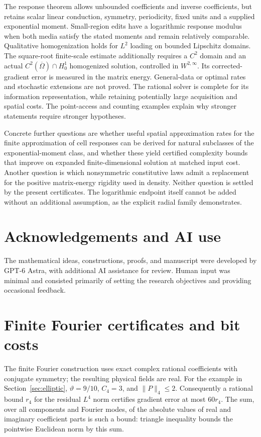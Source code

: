 \documentclass[11pt,a4paper]{article}
\numberwithin{equation}{section}
\theoremstyle{definition}
\theoremstyle{remark}\newtheorem{remark}[theorem]{Remark}
\newcommand{\norm}[1]{\lVert #1\rVert}
\begin{document}
The response theorem allows unbounded coefficients and inverse
coefficients, but retains scalar linear conduction, symmetry,
periodicity, fixed units and a supplied exponential moment.
Small-region edits have a logarithmic response modulus when both
media satisfy the stated moments and remain relatively comparable.
Qualitative homogenization holds for \(L^2\) loading on bounded
Lipschitz domains. The square-root finite-scale estimate additionally
requires a \(C^2\) domain and an actual
\(C^2(\overline\Omega)\cap H^1_0\) homogenized solution, controlled
in \(W^{2,\infty}\). Its corrected-gradient error is measured in
the matrix energy. General-data or optimal rates and stochastic
extensions are not proved. The rational solver is complete for its
information representation, while retaining potentially large
acquisition and spatial costs. The point-access and counting examples
explain why stronger statements require stronger hypotheses.

Concrete further questions are whether useful spatial approximation
rates for the finite approximation of cell responses can be derived
for natural subclasses of the exponential-moment class, and whether
these yield certified complexity bounds that
improve on expanded finite-dimensional solution at matched input cost.
Another question is which nonsymmetric constitutive laws admit a
replacement for the positive matrix-energy rigidity used in density.
Neither question is settled by the present certificates.
The logarithmic endpoint itself cannot be added without an additional
assumption, as the explicit radial family demonstrates.


\section*{Acknowledgements and AI use}
The mathematical ideas, constructions, proofs, and manuscript were developed
by GPT-6 Astra, with additional AI assistance for review. Human input was
minimal and consisted primarily of setting the research objectives and
providing occasional feedback.
\appendix

\section{Finite Fourier certificates and bit costs}\label{app:fourier}

The finite Fourier construction uses exact complex rational coefficients
with conjugate symmetry; the resulting physical fields are real.
For the example in Section~\ref{sec:elliptic},
\(\vartheta=9/10\), \(C_4=3\), and \(\norm P_4\leq2\).
Consequently a rational bound \(r_4\) for the residual \(L^4\) norm
certifies gradient error at most \(60r_4\).
The sum, over all components and Fourier modes, of the absolute
values of real and imaginary coefficient parts is such a bound:
triangle inequality bounds the pointwise Euclidean norm by this sum.
\end{document}
